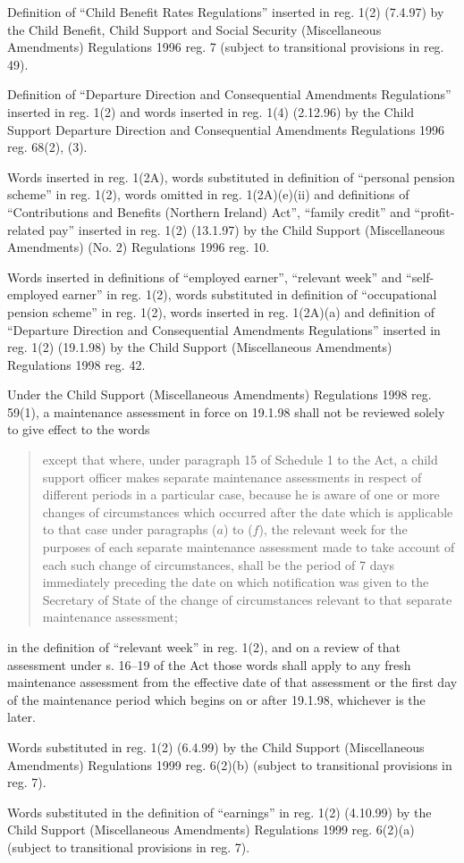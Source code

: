 \documentclass[12pt,a4paper]{article}
\begin{document}
{Definition of ``Child Benefit Rates Regulations'' inserted in reg. 1(2) (7.4.97) by the Child Benefit, Child Support and Social Security (Miscellaneous Amendments) Regulations 1996 reg. 7 (subject to transitional provisions in reg. 49).

Definition of ``Departure Direction and Consequential Amendments Regulations'' inserted in reg. 1(2) and words inserted in reg. 1(4) (2.12.96) by the Child Support Departure Direction and Consequential Amendments Regulations 1996 reg. 68(2), (3).

Words inserted in reg. 1(2A), words substituted in definition of ``personal pension scheme'' in reg. 1(2), words omitted in reg. 1(2A)(e)(ii) and definitions of ``Contributions and Benefits (Northern Ireland) Act'', ``family credit'' and ``profit-related pay'' inserted in reg. 1(2) (13.1.97) by the Child Support (Miscellaneous Amendments) (No. 2) Regulations 1996 reg. 10.

Words inserted in definitions of ``employed earner'', ``relevant week'' and ``self-employed earner'' in reg. 1(2), words substituted in definition of ``occupational pension scheme'' in reg. 1(2), words inserted in reg. 1(2A)(a) and definition of ``Departure Direction and Consequential Amendments Regulations'' inserted in reg. 1(2) (19.1.98) by the Child Support (Miscellaneous Amendments) Regulations 1998 reg. 42.

Under the Child Support (Miscellaneous Amendments) Regulations 1998 reg. 59(1), a maintenance assessment in force on 19.1.98 shall not be reviewed solely to give effect to the words
\begin{quotation}
except that where, under paragraph 15 of Schedule 1 to the Act, a child support officer makes separate maintenance assessments in respect of different periods in a particular case, because he is aware of one or more changes of circumstances which occurred after the date which is applicable to that case under paragraphs ($a$) to ($f$), the relevant week for the purposes of each separate maintenance assessment made to take account of each such change of circumstances, shall be the period of 7 days immediately preceding the date on which notification was given to the Secretary of State of the change of circumstances relevant to that separate maintenance assessment;
\end{quotation}
in the definition of ``relevant week'' in reg. 1(2), and on a review of that assessment under s. 16--19 of the Act those words shall apply to any fresh maintenance assessment from the effective date of that assessment or the first day of the maintenance period which begins on or after 19.1.98, whichever is the later.

Words substituted in reg. 1(2) (6.4.99) by the Child Support (Miscellaneous Amendments) Regulations 1999 reg. 6(2)(b) (subject to transitional provisions in reg. 7).

Words substituted in the definition of ``earnings'' in reg. 1(2) (4.10.99) by the Child Support (Miscellaneous Amendments) Regulations 1999 reg. 6(2)(a) (subject to transitional provisions in reg. 7).
}
\end{document}
